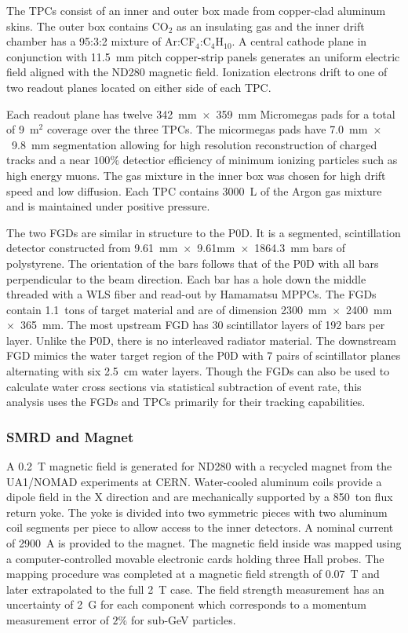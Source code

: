 The TPCs consist of an inner and outer box made from copper-clad
aluminum skins. The outer box contains CO$_2$ as an insulating gas and
the inner drift chamber has a 95:3:2 mixture of
Ar:CF$_4$:C$_4$H$_{10}$. A central cathode plane in conjunction with
11.5~mm pitch copper-strip panels generates an uniform
electric field aligned with the ND280 magnetic field. Ionization
electrons drift to one of two readout planes located on either side of
each TPC. 

Each readout plane has twelve 342~mm~$\times$~359~mm Micromegas pads for a
total of 9~m$^2$ coverage over the three TPCs. The micormegas pads
have 7.0~mm~$\times$~9.8~mm segmentation allowing for high resolution
reconstruction of charged tracks and a near $100\%$ detectior
efficiency of minimum ionizing particles such as high energy
muons. The gas mixture in the inner box was chosen for high drift speed and low
diffusion. Each TPC contains 3000~L of the Argon gas mixture and is
maintained under positive pressure.

The two FGDs are similar in structure to the P0D. It is a segmented,
scintillation detector constructed from 9.61~mm~$\times$~9.61mm~$\times$~1864.3~mm
bars of polystyrene. The orientation of the bars follows that of the
P0D with all bars perpendicular to the beam direction. Each bar has a
hole down the middle threaded with a WLS fiber and read-out by
Hamamatsu MPPCs. The FGDs contain 1.1~tons of target material and are
of dimension 2300~mm~$\times$~2400~mm~$\times$~365~mm. The most upstream FGD has 30
scintillator layers of 192 bars per layer. Unlike the P0D, there is no
interleaved radiator material. The downstream FGD mimics the water
target region of the P0D with 7 pairs of scintillator planes
alternating with six 2.5~cm water layers. Though the FGDs can also be
used to calculate water cross sections via statistical subtraction of
event rate, this analysis uses the FGDs and TPCs primarily for their
tracking capabilities. 

\subsubsection{SMRD and Magnet}

A 0.2~T magnetic field is generated for ND280 with a recycled magnet
from the UA1/NOMAD experiments at CERN. Water-cooled aluminum coils
provide a dipole field in the X direction and are mechanically supported by a
850~ton flux return yoke. The yoke is divided into two symmetric
pieces with two aluminum coil segments per piece to allow access to
the inner detectors. A nominal current of 2900~A is provided to the
magnet. The magnetic field inside was mapped using a
computer-controlled movable electronic cards holding three Hall
probes. The mapping procedure was completed at a magnetic field
strength of 0.07~T and later extrapolated to the full 2~T case. The
field strength measurement has an uncertainty of 2~G for each component
which corresponds to a momentum measurement error of $2\%$ for sub-GeV
particles. 

